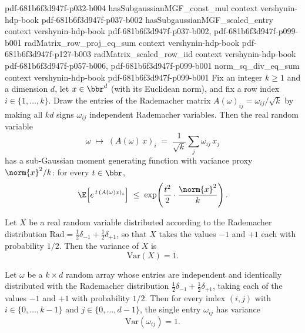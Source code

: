 \begin{lemma}
{    pdf-681b6f3d947f-p032-b004}
\proofstep
  {hasSubgaussianMGF_const_mul}
  {context}
  {vershynin-hdp-book}
  {pdf-681b6f3d947f-p037-b002}
\proofstep
  {hasSubgaussianMGF_scaled_entry}
  {context}
  {vershynin-hdp-book}
  {pdf-681b6f3d947f-p037-b002,
    pdf-681b6f3d947f-p099-b001}
\proofstep
  {radMatrix_row_proj_eq_sum}
  {context}
  {vershynin-hdp-book}
  {pdf-681b6f3d947f-p127-b003}
\proofstep
  {radMatrix_scaled_row_iid}
  {context}
  {vershynin-hdp-book}
  {pdf-681b6f3d947f-p057-b006,
    pdf-681b6f3d947f-p099-b001}
\proofstep
  {norm_sq_div_eq_sum}
  {context}
  {vershynin-hdp-book}
  {pdf-681b6f3d947f-p099-b001}
Fix an integer $k \ge 1$ and a dimension $d$, let $x \in \bbr^d$ (with its Euclidean
norm), and fix a row index $i \in \{1,\dots,k\}$. Draw the entries of the Rademacher
matrix $A(\omega)_{ij} = \omega_{ij}/\sqrt{k}$ by making all $kd$ signs $\omega_{ij}$
independent Rademacher variables. Then the real random variable
\[
\omega \;\longmapsto\; (A(\omega)\,x)_i \;=\; \frac{1}{\sqrt{k}}\sum_{j} \omega_{ij}\,
x_j
\]
has a sub-Gaussian moment generating function with variance proxy $\norm{x}^2/k$: for
every $t \in \bbr$,
\[
\E\!\left[e^{\,t\,(A(\omega)x)_i}\right] \;\le\;
\exp\!\left(\frac{t^2}{2}\cdot\frac{\norm{x}^2}{k}\right).
\]
\end{lemma}

\begin{lemma}
\label{variance_id_rademacherReal}
\leanok
{}
Let $X$ be a real random variable distributed according to the Rademacher distribution
$\mathrm{Rad} = \tfrac12\delta_{-1} + \tfrac12\delta_{+1}$, so that $X$ takes the values
$-1$ and $+1$ each with probability $1/2$. Then the variance of $X$ is
\[
\mathrm{Var}(X) = 1.
\]
\end{lemma}

\begin{lemma}
\label{variance_entry}
\leanok
{}
Let $\omega$ be a $k \times d$ random array whose entries are independent and
identically distributed with the Rademacher distribution $\tfrac{1}{2}\delta_{-1} +
\tfrac{1}{2}\delta_{+1}$, taking each of the values $-1$ and $+1$ with probability
$1/2$. Then for every index $(i,j)$ with $i \in \{0,\dots,k-1\}$ and $j \in
\{0,\dots,d-1\}$, the single entry $\omega_{ij}$ has variance
\[
\mathrm{Var}(\omega_{ij}) = 1.
\]
\end{lemma}

